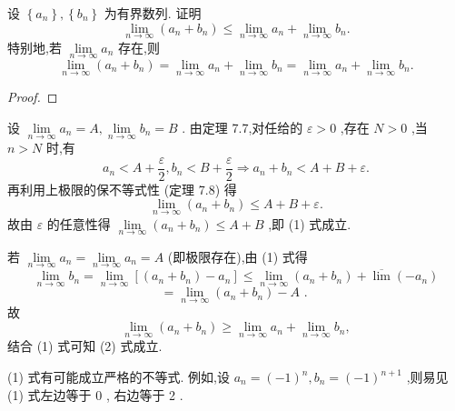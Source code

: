 \begin{example}

\end{example}
设 \(\left\{  {a}_{n}\right\}  ,\left\{  {b}_{n}\right\}\) 为有界数列. 证明
\[
\mathop{\lim }\limits_{{n \rightarrow  \infty }}\left( {{a}_{n} + {b}_{n}}\right)  \leq  \mathop{\lim }\limits_{{n \rightarrow  \infty }}{a}_{n} + \mathop{\lim }\limits_{{n \rightarrow  \infty }}{b}_{n}. \tag{1}
\]
特别地,若 \(\mathop{\lim }\limits_{{n \rightarrow  \infty }}{a}_{n}\) 存在,则
\[
\mathop{\lim }\limits_{{n \rightarrow  \infty }}\left( {{a}_{n} + {b}_{n}}\right)  = \mathop{\lim }\limits_{{n \rightarrow  \infty }}{a}_{n} + \mathop{\lim }\limits_{{n \rightarrow  \infty }}{b}_{n} = \mathop{\lim }\limits_{{n \rightarrow  \infty }}{a}_{n} + \mathop{\lim }\limits_{{n \rightarrow  \infty }}{b}_{n}. \tag{2}
\]
\begin{proof}

\end{proof}
设 \(\mathop{\lim }\limits_{{n \rightarrow  \infty }}{a}_{n} = A,\mathop{\lim }\limits_{{n \rightarrow  \infty }}{b}_{n} = B\) . 由定理 7.7,对任给的 \(\varepsilon  > 0\) ,存在 \(N > 0\) ,当 \(n > N\) 时,有
\[
{a}_{n} < A + \frac{\varepsilon }{2},{b}_{n} < B + \frac{\varepsilon }{2} \Rightarrow  {a}_{n} + {b}_{n} < A + B + \varepsilon .
\]
再利用上极限的保不等式性 (定理 7.8) 得
\[
\mathop{\lim }\limits_{{n \rightarrow  \infty }}\left( {{a}_{n} + {b}_{n}}\right)  \leq  A + B + \varepsilon .
\]
故由 \(\varepsilon\) 的任意性得 \(\mathop{\lim }\limits_{{n \rightarrow  \infty }}\left( {{a}_{n} + {b}_{n}}\right)  \leq  A + B\) ,即 (1) 式成立.

若 \(\mathop{\lim }\limits_{{n \rightarrow  \infty }}{a}_{n} = \mathop{\lim }\limits_{{n \rightarrow  \infty }}{a}_{n} = A\) (即极限存在),由 (1) 式得
\[
\mathop{\lim }\limits_{{n \rightarrow  \infty }}{b}_{n} = \mathop{\lim }\limits_{{n \rightarrow  \infty }}\left\lbrack  {\left( {{a}_{n} + {b}_{n}}\right)  - {a}_{n}}\right\rbrack   \leq  \mathop{\lim }\limits_{{n \rightarrow  \infty }}\left( {{a}_{n} + {b}_{n}}\right)  + \overline{\lim }\left( {-{a}_{n}}\right)
\]
\[
= \mathop{\lim }\limits_{{n \rightarrow  \infty }}\left( {{a}_{n} + {b}_{n}}\right)  - A\text{ . }
\]
故
\[
\mathop{\lim }\limits_{{n \rightarrow  \infty }}\left( {{a}_{n} + {b}_{n}}\right)  \geq  \mathop{\lim }\limits_{{n \rightarrow  \infty }}{a}_{n} + \mathop{\lim }\limits_{{n \rightarrow  \infty }}{b}_{n},
\]
结合 (1) 式可知 (2) 式成立.

\begin{remark}

\end{remark}
(1) 式有可能成立严格的不等式. 例如,设 \({a}_{n} = {\left( -1\right) }^{n},{b}_{n} = {\left( -1\right) }^{n + 1}\) ,则易见 (1) 式左边等于 0 , 右边等于 2 .

